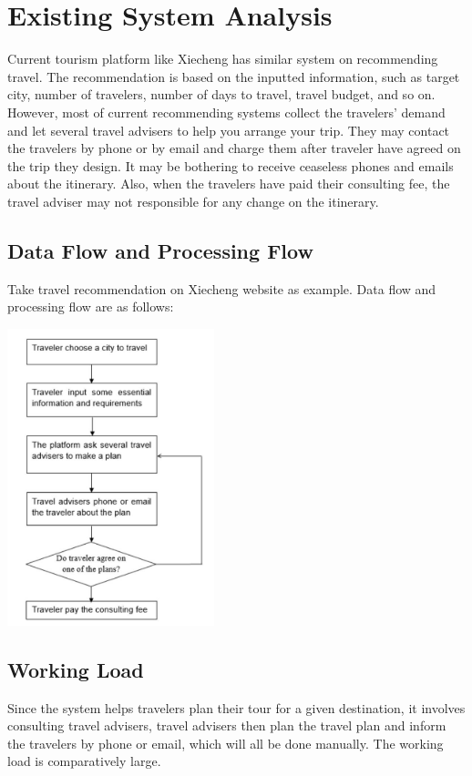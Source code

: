 \documentclass[10pt]{article}
\begin{document}
\section{Existing System Analysis}
Current tourism platform like Xiecheng has similar system on recommending travel. The recommendation is based on the inputted information, such as target city, number of travelers, number of days to travel, travel budget, and so on. However, most of current recommending systems collect the travelers’ demand and let several travel advisers to help you arrange your trip. They may contact the travelers by phone or by email and charge them after traveler have agreed on the trip they design. It may be bothering to receive ceaseless phones and emails about the itinerary. Also, when the travelers have paid their consulting fee, the travel adviser may not responsible for any change on the itinerary. 

\subsection{Data Flow and Processing Flow}
Take travel recommendation on Xiecheng website as example. Data flow and processing flow are as follows:

\begin{center}
  \includegraphics[width=6cm]{1.jpg}
\end{center}

\subsection{Working Load} 
Since the system helps travelers plan their tour for a given destination, it involves consulting travel advisers, travel advisers then plan the travel plan and inform the travelers by phone or email, which will all be done manually. The working load is comparatively large.
\end{document}
